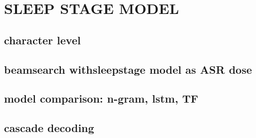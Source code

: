 \chapter{SLEEP STAGE MODEL}
\section{character level ~}
\section{beamsearch withsleepstage model as ASR dose}
\section{model comparison: n-gram, lstm, TF }
\section{cascade decoding}